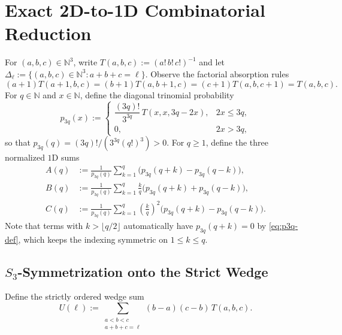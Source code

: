 \documentclass[11pt,a4paper]{article}
\numberwithin{equation}{section}
\theoremstyle{plain}
\theoremstyle{definition}
\theoremstyle{remark}
\newcommand{\N}{\mathbb{N}}
\begin{document}
\section{Exact 2D-to-1D Combinatorial Reduction}
\label{sec:combinatorial}

For $(a,b,c)\in\N^3$, write $T(a,b,c):=(a!\,b!\,c!)^{-1}$ and let $\Delta_\ell:=\{(a,b,c)\in\N^3:a+b+c=\ell\}$. Observe the factorial absorption rules
\begin{equation}\label{eq:T-absorb}
  (a+1)T(a+1,b,c) = (b+1)T(a,b+1,c) = (c+1)T(a,b,c+1) = T(a,b,c).
\end{equation}
For $q\in\N$ and $x\in\N$, define the diagonal trinomial probability
\begin{equation}\label{eq:p3q-def}
  p_{3q}(x) := \begin{cases}
    \dfrac{(3q)!}{3^{3q}}\,T(x,x,3q-2x), & 2x\le 3q,\\[0.5em]
    0, & 2x > 3q,
  \end{cases}
\end{equation}
so that $p_{3q}(q)=(3q)!/(3^{3q}(q!)^3)>0$. For $q\ge 1$, define the three normalized $1\mathrm{D}$ sums
\begin{align}
  A(q) &:= \frac{1}{p_{3q}(q)}\sum_{k=1}^{q}\bigl(p_{3q}(q+k) - p_{3q}(q-k)\bigr), \label{eq:sumA-def}\\
  B(q) &:= \frac{1}{p_{3q}(q)}\sum_{k=1}^{q}\frac{k}{q}\bigl(p_{3q}(q+k) + p_{3q}(q-k)\bigr), \label{eq:sumB-def}\\
  C(q) &:= \frac{1}{p_{3q}(q)}\sum_{k=1}^{q}\left(\frac{k}{q}\right)^2\bigl(p_{3q}(q+k) - p_{3q}(q-k)\bigr). \label{eq:sumC-def}
\end{align}
Note that terms with $k>\lfloor q/2\rfloor$ automatically have $p_{3q}(q+k)=0$ by \eqref{eq:p3q-def}, which keeps the indexing symmetric on $1\le k\le q$.

\subsection{\texorpdfstring{$S_3$}{S3}-Symmetrization onto the Strict Wedge}

Define the strictly ordered wedge sum
\begin{equation}\label{eq:uvSum-def}
  U(\ell) := \sum_{\substack{a<b<c\\ a+b+c=\ell}} (b-a)(c-b)\,T(a,b,c).
\end{equation}
\end{document}
